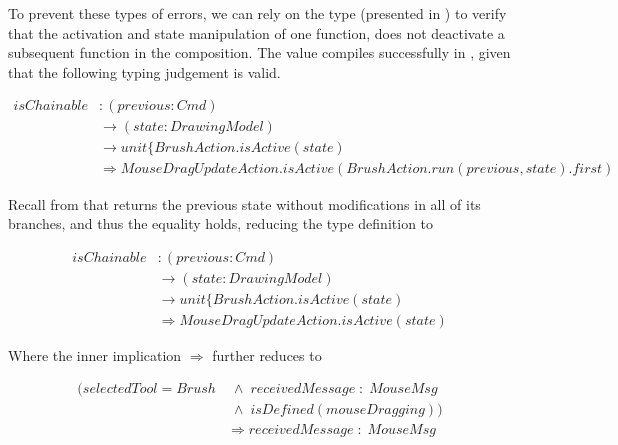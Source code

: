 To prevent these types of errors, we can rely on the  type (presented in 
) to verify that the activation and state manipulation of one 
function, does not deactivate a subsequent function in the composition. The  value 
compiles successfully in , given that the following typing judgement is 
valid.

\begin{equation}
\label{eq:brush-acction-dependency}
\begin{split}
isChainable &: (previous: Cmd) \\
            &\rightarrow (state: DrawingModel) \\
            &\rightarrow unit\{BrushAction.isActive(state) \\
            &\Rightarrow MouseDragUpdateAction.isActive(BrushAction.run(previous, state).first)
\end{split}
\end{equation}

Recall from  that  returns the previous state without 
modifications in all of its branches, and thus the equality  holds, reducing 
the type definition to

\begin{equation*}
\begin{split}
isChainable &: (previous: Cmd) \\
            &\rightarrow (state: DrawingModel) \\
            &\rightarrow unit\{BrushAction.isActive(state) \\
            &\Rightarrow MouseDragUpdateAction.isActive(state)
\end{split}
\end{equation*}

Where the inner implication  $\Rightarrow$  further reduces to

\begin{equation}
\label{eq:brush-mouse-drag-impl}
\begin{split}
(selectedTool = Brush & \; \wedge \; receivedMessage \; : \; MouseMsg \\
  & \; \wedge \; isDefined(mouseDragging)) \\
  & \Rightarrow receivedMessage \; : \; MouseMsg
\end{split}
\end{equation}

